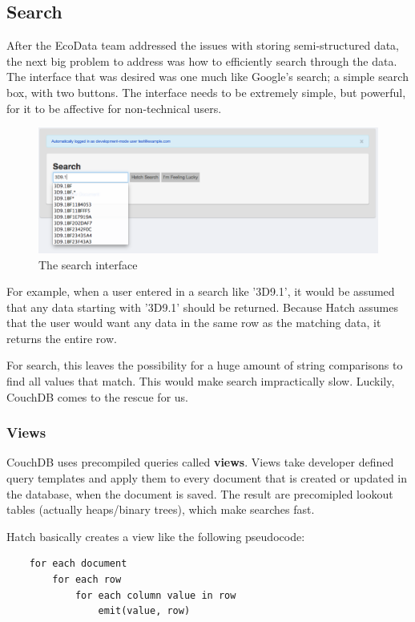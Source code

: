 \subsection{Search}
After the EcoData team addressed the issues with storing semi-structured data, the next 
big problem to address was how to efficiently search through the data. The interface 
that was desired was one much like Google's search; a simple search box, with two
buttons. The interface needs to be extremely simple, but powerful, for it to be 
affective for non-technical users. 

\begin{figure}[h]
	\begin{center}
	\includegraphics[width=120mm]{images/search_ss1}
	\caption{The search interface} 
	\label{search_ss1}
	\end{center}
\end{figure}

For example, when a user entered in a search like '3D9.1', it would be assumed that 
any data starting with '3D9.1' should be returned. Because Hatch assumes that
the user would want any data in the same row as the matching data, it returns
the entire row. 

For search, this leaves the possibility for a huge amount of string comparisons to find
all values that match. This would make search impractically slow. Luckily, CouchDB comes
to the rescue for us.


\subsubsection{Views}
CouchDB uses precompiled queries called \textbf{views}. Views take developer defined
query templates and apply them to every document that is created or updated in the 
database, when the document is saved. The result are precomipled lookout tables 
(actually heaps/binary trees), which make searches fast. 

Hatch basically creates a view like the following pseudocode:
\begin{lstlisting}
	for each document
		for each row
			for each column value in row
				emit(value, row)
\end{lstlisting}

